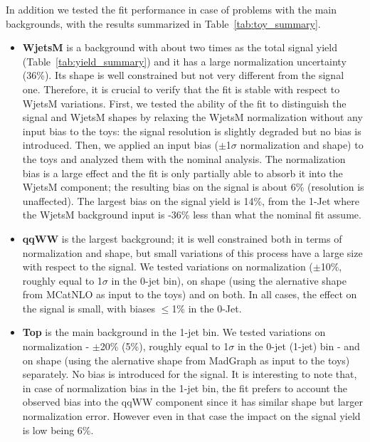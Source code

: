 In addition we tested the fit performance in case of problems with the main backgrounds, with the results summarized 
in Table~\ref{tab:toy_summary}.
\begin{itemize}

\item {\bf WjetsM} is a background with about two times as the total signal yield (Table~\ref{tab:yield_summary}) and it has a large normalization uncertainty (36\%). 
Its shape is well constrained but not very different from the signal one. 
Therefore, it is crucial to verify that the fit is stable with respect to WjetsM variations.
First, we tested the ability of the fit to distinguish the signal and WjetsM shapes by relaxing the WjetsM normalization 
without any input bias to the toys: the signal resolution is slightly degraded but no bias is introduced. 
Then, we applied an input bias ($\pm$1$\sigma$ normalization and shape) to the toys and analyzed them with the nominal analysis. 
The normalization bias is a large effect and the fit is only partially able to absorb it into the WjetsM component; 
the resulting bias on the signal is about 6\% (resolution is unaffected). 
The largest bias on the signal yield is 14\%, from the 1-Jet where the WjetsM background input is -36\% less than what 
the nominal fit assume.

\item {\bf qqWW} is the largest background; it is well constrained both in terms of normalization and shape, but small variations of this 
process have a large size with respect to the signal. 
We tested variations on normalization ($\pm$10\%, roughly equal to 1$\sigma$ in the 0-jet bin), 
on shape (using the alernative shape from MCatNLO as input to the toys) and on both. 
In all cases, the effect on the signal is small, with biases $\leq$1\% in the 0-Jet.  

\item {\bf Top} is the main background in the 1-jet bin. 
We tested variations on normalization - $\pm$20\% (5\%), roughly equal to 1$\sigma$ in the 0-jet (1-jet) bin - and on shape 
(using the alernative shape from MadGraph as input to the toys) separately. No bias is introduced for the signal. 
It is interesting to note that, in case of normalization bias in the 1-jet bin, the fit prefers to account the observed bias 
into the qqWW component since it has similar shape but larger normalization error. However even in that case the impact 
on the signal yield is low being 6\%. 
\end{itemize}


